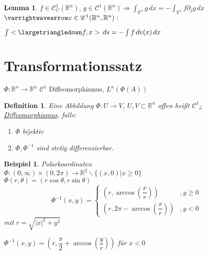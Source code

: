 \documentclass[11pt]{memoir}
\theoremstyle{changebreak}
\newtheorem{Definition}{Definition}[chapter]
\newtheorem{Beispiel}{Beispiel}[chapter]
\newtheorem{Lemma}{Lemma}[chapter]
\begin{document}
\begin{Lemma}
$f \in \mathscr C^1_C(\mathbb R^n), \, g\in \mathscr C^1(\mathbb R^n) \Rightarrow \int_{\mathbb R^n}g\, dx = - \int_{\mathbb R^n}f \partial_j g\, dx$ \\
$\varrightwavearrow x \in \mathscr C^1(\mathbb R^n, \mathbb R^n):$
\begin{center}
	$\int <\largetriangledown f, x>\, ds = - \int f\, dv(x) \,dx$
\end{center}
\end{Lemma}


\section{Transformationssatz}


$\Phi: \mathbb R^n \rightarrow \mathbb R^n$ $\mathscr C^1$ Diffeomorphismus, $L^n(\Phi(A))$

\begin{Definition}
Eine Abbildung $\Phi: U \rightarrow V$, $U, V \subset \mathbb R^n$ offen heißt \underline{$\mathscr C^1$-Diffeomorphismus}, falls:
\begin{enumerate}
	\item $\Phi$ bijektiv
	\item $\Phi, \Phi^{-1}$ sind stetig differenzierbar.
\end{enumerate}
\end{Definition}

\begin{Beispiel}
\emph{Polarkoordinaten} \\
$\Phi: (0, \infty) \times (0, 2\pi) \rightarrow \mathbb R^2 \backslash \{(x, 0)| x \geq 0\}$ \\
$\Phi(r, \theta) = (r \cos \theta, r \sin \theta)$ \\
\begin{equation}
	\Phi^{-1}(x, y) =
	\begin{cases}
		(r, \arccos\left(\dfrac{x}{r}\right)) & , y \geq 0 \\
		(r, 2\pi - \arccos\left(\dfrac{x}{r}\right)) & , y < 0
	\end{cases}
\end{equation}
mit $r = \sqrt{|x|^2 + y^2} $\\
\begin{center}
	$\Phi^{-1} (x, y) = \left(r, \dfrac{\pi}{2} + \arccos\left(\dfrac{y}{r}\right)\right)$ \quad für $x < 0$
\end{center}

\end{Beispiel}
\end{document}
